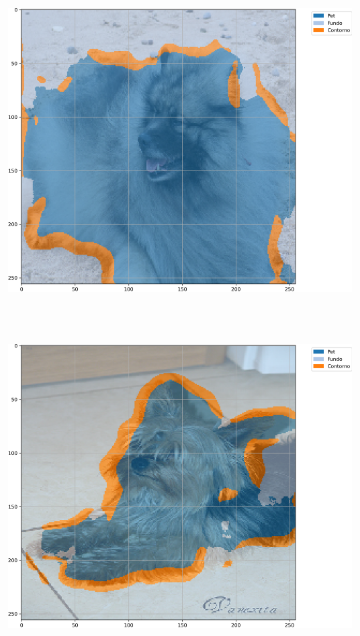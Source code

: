 \begin{figure}[H]
    \centering
    \caption[Segmentação com U-Net, \textit{Max Pooling}, 500 épocas, \textit{Oxford-IIIT Pets}, acurácia]{Exemplos segmentados a partir de U-Net com \textit{Max Pooling} e 500 épocas no conjunto de dados \textit{Oxford-IIIT Pets} baseada em acurácia.}
    \label{results:fig:semantic:4}
     \begin{subfigure}[t]{0.32\textwidth}
         \centering
         \includegraphics[width=1\linewidth]{recursos/imagens/results/max_acc_unet500_image_0_overlayed_segmentation.png}
         \label{results:fig:semantic:4.1}
     \end{subfigure}%
     ~ 
     \begin{subfigure}[t]{0.32\textwidth}
         \centering
         \includegraphics[width=1\linewidth]{recursos/imagens/results/max_acc_unet500_image_1_overlayed_segmentation.png}

\end{subfigure}
\end{figure}
